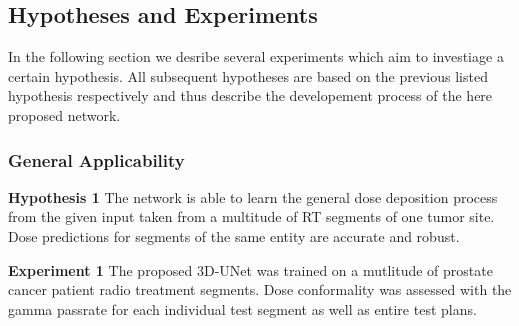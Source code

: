\subsection{Hypotheses and Experiments}

In the following section we desribe several experiments which aim to investiage a certain hypothesis. All subsequent hypotheses are based on the previous listed hypothesis respectively and thus describe the developement process of the here proposed network. 

\subsubsection{General Applicability}\label{sssec:H1}
\begin{hanginglist}\itemsep2pt

    \item\textbf{Hypothesis 1}\newline
    The network is able to learn the general dose deposition process from the given input taken from a multitude of \acs{RT} segments of one tumor site. 
    Dose predictions for segments of the same entity are accurate and robust.\newpage

    \item\textbf{Experiment 1}\newline
    The proposed 3D-UNet was trained on a mutlitude of prostate cancer patient radio treatment segments. 
    Dose conformality was assessed with the gamma passrate for each individual test segment as well as entire test plans.\\

\end{hanginglist}

